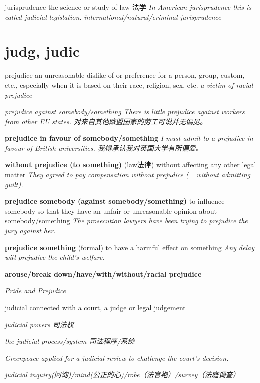 \begin{DefWord}{jurisprudence}
    the science or study of law 法学
    \textit{In American jurisprudence this is called judicial legislation.}
    \textit{international/natural/criminal jurisprudence}
\end{DefWord}





\section{judg, judic}


\begin{DefWord}{prejudice}
    an unreasonable dislike of or preference for a person, group, custom, etc., especially when it is based on their race, religion, sex, etc.
    \textit{a victim of racial prejudice}

    \textit{prejudice against somebody/something There is little prejudice against workers from other EU states. 对来自其他欧盟国家的劳工可说并无偏见。}
    
    \textbf{prejudice in favour of somebody/something} \textit{I must admit to a prejudice in favour of British universities. 我得承认我对英国大学有所偏爱。}

    \textbf{without prejudice (to something)}
    (law法律) without affecting any other legal matter
    \textit{They agreed to pay compensation without prejudice (= without admitting guilt).}

    \textbf{prejudice somebody (against somebody/something)} to influence somebody so that they have an unfair or unreasonable opinion about somebody/something
    \textit{The prosecution lawyers have been trying to prejudice the jury against her.}

    \textbf{prejudice something} (formal) to have a harmful effect on something
    \textit{Any delay will prejudice the child's welfare.}

    \textbf{arouse/break down/have/with/without/racial prejudice}

    \textit{Pride and Prejudice}

\end{DefWord}

\begin{DefWord}{judicial}
    connected with a court, a judge or legal judgement

    \textit{judicial powers 司法权}

    \textit{the judicial process/system 司法程序/系统}

    \textit{Greenpeace applied for a judicial review to challenge the court’s decision.}

    \textit{judicial inquiry(问询)/mind(公正的心)/robe（法官袍）/survey（法庭调查）}
\end{DefWord}

